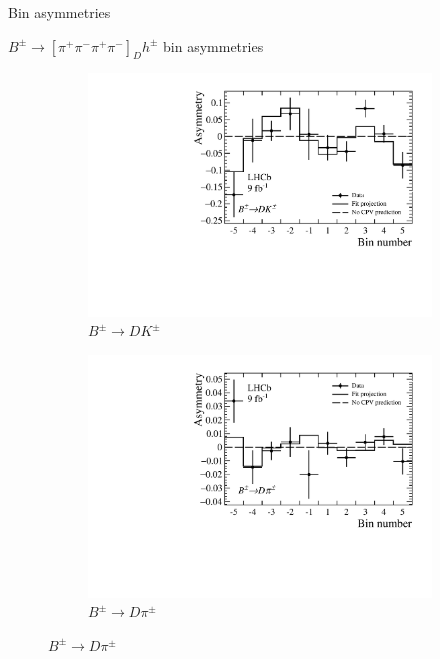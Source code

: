 \documentclass{beamer}
\begin{document}
\begin{frame}{Bin asymmetries}
  \begin{center}
    $B^\pm\to[\pi^+\pi^-\pi^+\pi^-]_Dh^\pm$ bin asymmetries
  \end{center}
  \begin{figure}
    \centering
    \begin{subfigure}{0.5\textwidth}
      \centering
      \includegraphics[width=1.0\textwidth]{Plots/BinAsymmetries_dk_pipipipi.pdf}
      \caption*{$B^\pm\to DK^\pm$}
    \end{subfigure}%
    \begin{subfigure}{0.5\textwidth}
      \centering
      \includegraphics[width=1.0\textwidth]{Plots/BinAsymmetries_dpi_pipipipi.pdf}
      \caption*{$B^\pm\to D\pi^\pm$}
    \end{subfigure}
  \end{figure}
\end{frame}
\end{document}
